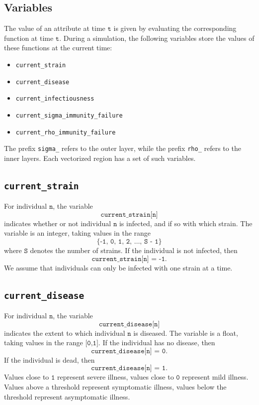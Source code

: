 \documentclass[10pt,letterpaper]{article}
\begin{document}
\subsection*{Variables}
The value of an attribute at time $\texttt{t}$ is given by evaluating the corresponding function at time $\texttt{t}$. During a simulation, the following variables store the values of these functions at the current time:
\begin{itemize}
\item \texttt{current{\_}strain}
\item \texttt{current{\_}disease}
\item \texttt{current{\_}infectiousness}
\item \texttt{current{\_}sigma{\_}immunity{\_}failure}
\item \texttt{current{\_}rho{\_}immunity{\_}failure}
\end{itemize}
The prefix \texttt{sigma{\_}} refers to the outer layer, while the prefix \texttt{rho{\_}} refers to the inner layers. Each vectorized region has a set of such variables.

\subsection*{\texttt{current{\_}strain}}
For individual $\texttt{n}$, the variable $$\texttt{current{\_}strain[n]}$$ indicates whether or not individual $\texttt{n}$ is infected, and if so with which strain. The variable is an integer, taking values in the range $$\{\texttt{-1, 0, 1, 2, \ldots, S - 1}\}$$ where $\texttt{S}$ denotes the number of strains. If the individual is not infected, then $$\texttt{current{\_}strain[n] = -1}.$$ We assume that individuals can only be infected with one strain at a time.

\subsection*{\texttt{current{\_}disease}}
For individual $\texttt{n}$, the variable $$\texttt{current{\_}disease[n]}$$ indicates the extent to which individual $\texttt{n}$ is diseased. The variable is a float, taking values in the range $\texttt{[0,1]}.$ If the individual has no disease, then $$\texttt{current{\_}disease[n] = 0}.$$ If the individual is dead, then $$\texttt{current{\_}disease[n] = 1}.$$ Values close to $\texttt{1}$ represent severe illness, values close to $\texttt{0}$ represent mild illness. Values above a threshold represent symptomatic illness, values below the threshold represent asymptomatic illness. 
\end{document}
